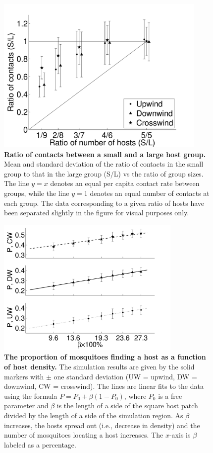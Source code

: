 \documentclass[10pt]{article}
\begin{document}
\begin{figure}[!htp]
\includegraphics[width=4in]{revised2figs/Figure5}
\caption{
{\bf Ratio of contacts between a small and a large host group.} Mean and standard deviation of the ratio of contacts in the small group to that in the large group (S/L) vs the ratio of group sizes. The line $y=x$ denotes an equal per capita contact rate between groups, while the line $y=1$ denotes an equal number of contacts at each group. The data corresponding to a given ratio of hosts have been separated
	slightly in the figure for visual purposes only.}
	\label{fig:2groupsres}
\end{figure}

\begin{figure}[!htp]
\includegraphics[width=3.5in]{revised2figs/Figure6}
\caption{
{\bf The proportion of mosquitoes finding a host as a function of host density.} The simulation results are given by the solid markers with $\pm$ one standard deviation (UW = upwind, DW = downwind, CW = crosswind). The lines are linear fits to the data using the formula $P = P_0 + \beta(1-P_0)$, where $P_0$ is a free parameter and $\beta$ is the length of a side of the square host patch divided by the length of a side of the simulation region. As $\beta$ increases, the hosts spread out (i.e., decrease in density) and the number of mosquitoes locating a host increases. The $x$-axis is $\beta$ labeled as a percentage. }
	\label{fig:Density}
\end{figure}
\end{document}
